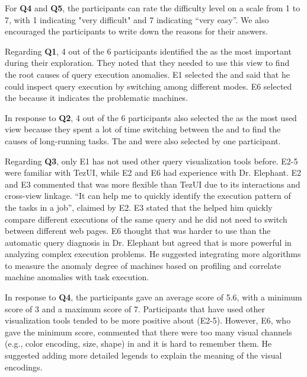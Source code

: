 For \textbf{Q4} and \textbf{Q5}, the participants can rate the difficulty level on a scale from 1 to 7, with 1 indicating "very difficult" and 7 indicating ``very easy''. We also encouraged the participants to write down the reasons for their answers. 

Regarding \textbf{Q1}, 4 out of the 6 participants identified the  as the most important during their exploration. They noted that they needed to use this view to find the root causes of query execution anomalies. E1 selected the  and said that he could inspect query execution by switching among different modes. E6 selected the  because it indicates the problematic machines.

In response to \textbf{Q2}, 4 out of the 6 participants also selected the  as the most used view because they spent a lot of time switching between the  and  to find the causes of long-running tasks. The  and  were also selected by one participant.

Regarding \textbf{Q3}, only E1 has not used other query visualization tools before. E2-5 were familiar with TezUI, while E2 and E6 had experience with Dr. Elephant. 
E2 and E3 commented that \qevis{} was more flexible than TezUI due to its interactions and cross-view linkage. ``It can help me to quickly identify the execution pattern of the tasks in a job'', claimed by E2. E3 stated that the  helped him quickly compare different executions of the same query and he did not need to switch between different web pages.
E6 thought that \qevis{} was harder to use than the automatic query diagnosis in Dr. Elephant but agreed that \qevis{} is more powerful in analyzing complex execution problems. He suggested integrating more algorithms to measure the anomaly degree of machines based on profiling and correlate machine anomalies with task execution.

In response to \textbf{Q4}, the participants gave an average score of 5.6, with a minimum score of 3 and a maximum score of 7. Participants that have used other visualization tools tended to be more positive about \qevis{} (E2-5). 
However, E6, who gave the minimum score, commented that there were too many visual channels (e.g., color encoding, size, shape) in \qevis{} and it is hard to remember them. He suggested adding more detailed legends to explain the meaning of the visual encodings.  



